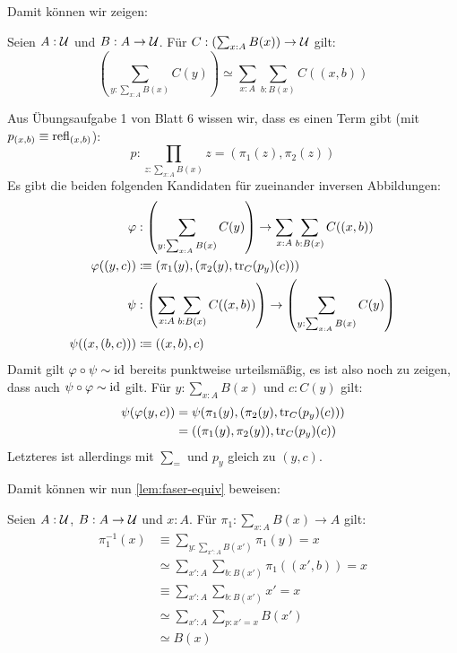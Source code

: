 Damit können wir zeigen:

\begin{lemma}
  Seien $A:\mathcal{U}$ und $B:A\to\mathcal{U}$. Für $C:\left(\sum_{x:A}B(x)\right)\to\mathcal{U}$ gilt:
  \[
    \left(\sum_{y:\sum_{x:A}B(x)}C(y)\right)\simeq \sum_{x:A}\sum_{b:B(x)}C((x,b))
  \]
\end{lemma}
\begin{beweis}
  Aus Übungsaufgabe 1 von Blatt 6 wissen wir, dass es einen Term gibt (mit $p_{(x,b)}\equiv\mathrm{refl}_{(x,b)}$):
  \[
    p:\prod_{z:\sum_{x:A}B(x)}z=(\pi_1(z),\pi_2(z))
  \]
  Es gibt die beiden folgenden Kandidaten für zueinander inversen Abbildungen:
  \begin{align*}
    \varphi&:\left(\sum_{y:\sum_{x:A}B(x)}C(y)\right)\to \sum_{x:A}\sum_{b:B(x)}C((x,b))\\
    \varphi((y,c))&\vcentcolon\mspace{-1.2mu}\equiv (\pi_1(y),(\pi_2(y),\mathrm{tr}_C(p_y)(c))) \\
    \psi&: \left(\sum_{x:A}\sum_{b:B(x)}C((x,b))\right)\to\left(\sum_{y:\sum_{x:A}B(x)}C(y)\right) \\
    \psi((x,(b,c)))&\vcentcolon\mspace{-1.2mu}\equiv((x,b),c)
  \end{align*}
  Damit gilt $\varphi\circ\psi\sim\mathrm{id}$ bereits punktweise urteilsmäßig, es ist also noch zu zeigen, dass auch $\psi\circ\varphi\sim\mathrm{id}$ gilt.
  Für $y:\sum_{x:A}B(x)$ und $c:C(y)$ gilt:
  \begin{align*}
    \psi(\varphi(y,c))&=\psi(\pi_1(y),(\pi_2(y),\mathrm{tr}_{C}(p_y)(c))) \\
    &=((\pi_1(y),\pi_2(y)), \mathrm{tr}_{C}(p_y)(c))
  \end{align*}
  Letzteres ist allerdings mit $\sum_=$ und $p_y$ gleich zu $(y,c)$.
\end{beweis}

Damit können wir nun \cref{lem:faser-equiv} beweisen:

\begin{beweis}
  Seien $A:\mathcal{U}$, $B:A\to\mathcal{U}$ und $x:A$. Für $\pi_1:\sum_{x:A}B(x)\to A$ gilt:
  \begin{align*}
    \pi_1^{-1}(x)&\equiv \sum_{y:\sum_{x':A}B(x')}\pi_1(y)=x\\
                 &\simeq \sum_{x':A}\sum_{b:B(x')}\pi_1((x',b))=x \\
                 &\equiv \sum_{x':A}\sum_{b:B(x')} x'=x \\
                 &\simeq \sum_{x':A}\sum_{p:x'=x}B(x')\\
                 &\simeq B(x)
  \end{align*}
\end{beweis}


